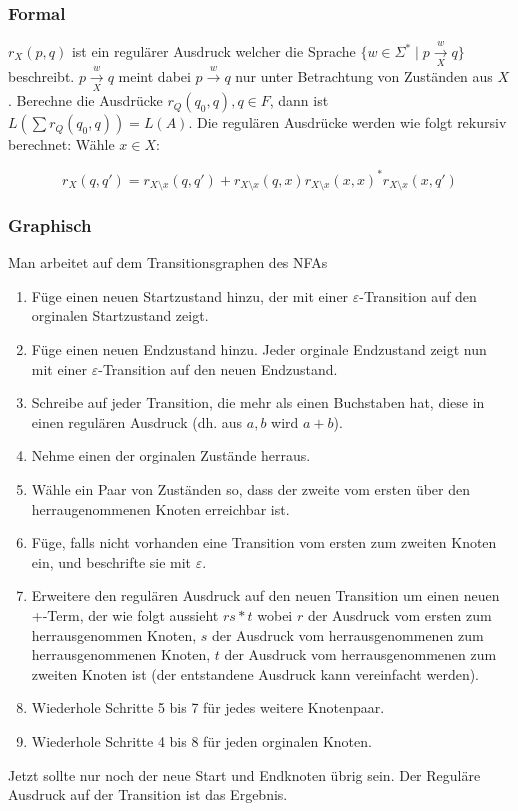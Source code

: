 \documentclass[11pt]{scrartcl}
\begin{document}
\subsubsection{Formal}

$r_X (p,q)$ ist ein regulärer Ausdruck welcher die Sprache $\{w \in \Sigma^*\mid p \overset{w}{\underset{X}{\rightarrow}} q\}$ beschreibt. $p \overset{w}{\underset{X}{\rightarrow}} q$ meint dabei $p \overset{w}{\rightarrow} q$ nur unter Betrachtung von Zuständen aus $X$. Berechne die Ausdrücke $r_Q (q_0,q), q \in F$, dann ist $L(\sum r_Q(q_0, q)) = L(A)$. Die regulären Ausdrücke werden wie folgt rekursiv berechnet: Wähle $x \in X$:

\[r_X(q,q') = r_{X \setminus x}(q,q') + r_{X \setminus x}(q,x)r_{X \setminus x}(x,x)^*r_{X \setminus x}(x,q')\]
\subsubsection{Graphisch}

Man arbeitet auf dem Transitionsgraphen des NFAs

\begin{enumerate}
	\item Füge einen neuen Startzustand hinzu, der mit einer $\varepsilon$-Transition auf den orginalen Startzustand zeigt.
    \item Füge einen neuen Endzustand hinzu. Jeder orginale Endzustand zeigt nun mit einer $\varepsilon$-Transition auf den neuen Endzustand.
    \item Schreibe auf jeder Transition, die mehr als einen Buchstaben hat, diese in einen regulären Ausdruck (dh. aus $a,b$ wird $a + b$).
    \item Nehme einen der orginalen Zustände herraus.
    \item Wähle ein Paar von Zuständen so, dass der zweite vom ersten über den herraugenommenen Knoten erreichbar ist.
    \item Füge, falls nicht vorhanden eine Transition vom ersten zum zweiten Knoten ein, und beschrifte sie mit $\varepsilon$.
    \item Erweitere den regulären Ausdruck auf den neuen Transition um einen neuen +-Term, der wie folgt aussieht $rs*t$ wobei $r$ der Ausdruck vom ersten zum herrausgenommen Knoten, $s$ der Ausdruck vom herrausgenommenen zum herrausgenommenen Knoten, $t$ der Ausdruck vom herrausgenommenen zum zweiten Knoten ist (der entstandene Ausdruck kann vereinfacht werden).
    \item Wiederhole Schritte 5 bis 7 für jedes weitere Knotenpaar.
    \item Wiederhole Schritte 4 bis 8 für jeden orginalen Knoten.
\end{enumerate}
Jetzt sollte nur noch der neue Start und Endknoten übrig sein. Der Reguläre Ausdruck auf der Transition ist das Ergebnis.
\end{document}
